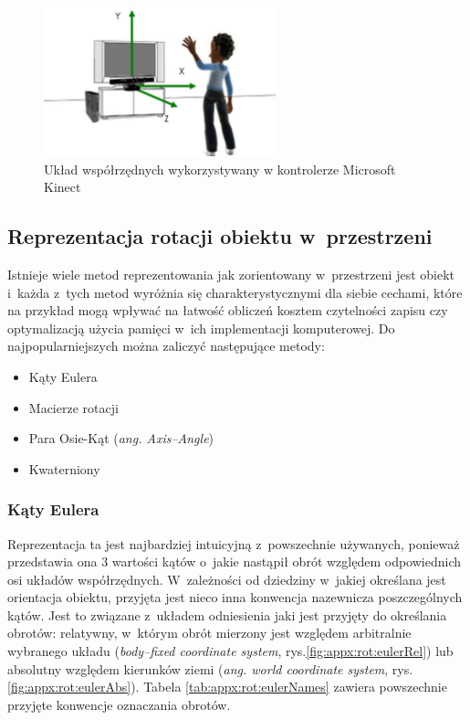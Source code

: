 	\begin{figure}
		\centering
		\includegraphics[width=0.6\textwidth]{images/skeletonSpace.png}
		\caption{Układ współrzędnych wykorzystywany w kontrolerze Microsoft Kinect \cite{msdn:kinectCoordSpace2016}}
		\label{fig:characteristics:kinect:space}
	\end{figure}
		

	\subsection{Reprezentacja rotacji obiektu w~przestrzeni}\label{chap:orientstionRep}
	Istnieje wiele metod reprezentowania jak zorientowany w~przestrzeni jest obiekt i~każda z~tych metod wyróżnia się charakterystycznymi dla siebie cechami, które na przykład mogą wpływać na łatwość obliczeń kosztem czytelności zapisu czy optymalizacją użycia pamięci w~ich implementacji komputerowej. Do najpopularniejszych można zaliczyć następujące metody:
	
	\begin{itemize}
		\item Kąty Eulera
		\item Macierze rotacji
		\item Para Osie-Kąt (\emph{ang. Axis--Angle})
		\item Kwaterniony
	\end{itemize} 
		
	\subsubsection*{Kąty Eulera} \label{sec:orientstionRep:euler}
	Reprezentacja ta jest najbardziej intuicyjną z~powszechnie używanych, ponieważ przedstawia ona 3 wartości kątów o~jakie nastąpił obrót względem odpowiednich osi układów współrzędnych. W~zależności od dziedziny w~jakiej określana jest orientacja obiektu, przyjęta jest nieco inna konwencja nazewnicza poszczególnych kątów. Jest to związane z~układem odniesienia jaki jest przyjęty do określania obrotów: relatywny, w~którym obrót mierzony jest względem arbitralnie wybranego układu (\emph{body--fixed coordinate system}, rys.\ref{fig:appx:rot:eulerRel}) lub absolutny względem kierunków ziemi (\emph{ang. world coordinate system}, rys.\ref{fig:appx:rot:eulerAbs}). Tabela \ref{tab:appx:rot:eulerNames} zawiera powszechnie przyjęte konwencje oznaczania obrotów.
		
